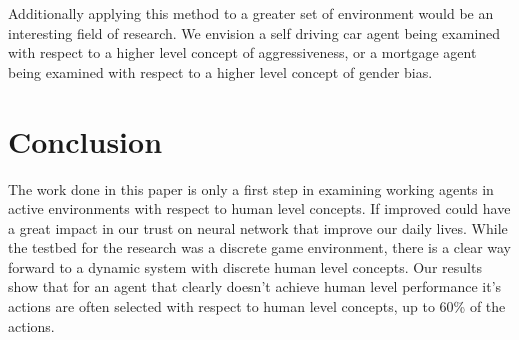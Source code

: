 Additionally applying this method to a greater set of environment would be an interesting field of research. We envision a self driving car agent being examined with respect to a higher level concept of aggressiveness, or a mortgage agent being examined with respect to a higher level concept of gender bias.

\section{Conclusion}

The work done in this paper is only a first step in examining working agents in active environments with respect to human level concepts. If improved could have a great impact in our trust on neural network that improve our daily lives. While the testbed for the research was a discrete game environment, there is a clear way forward to a dynamic system with discrete human level concepts. Our results show that for an agent that clearly doesn't achieve human level performance it's actions are often selected with respect to human level concepts, up to 60\% of the actions.
